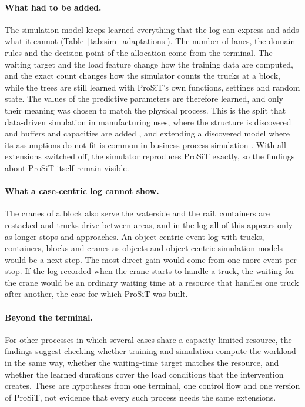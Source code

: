 \paragraph{What had to be added.} The simulation model keeps learned everything that
the log can express and adds what it cannot (Table~\ref{tab:sim_adaptations}). The
number of lanes, the domain rules and the decision point of the allocation come from
the terminal. The waiting target and the load feature change how the training data
are computed, and the exact count changes how the simulator counts the trucks at a
block, while the trees are still learned with ProSiT's own functions, settings and
random state. The values of the predictive parameters are
therefore learned, and only their meaning was chosen to match the physical process.
This is the split that data-driven simulation in manufacturing uses, where the
structure is discovered and buffers and capacities are added
\cite{LugaresiMatta2021,Grobis2025ProductionLogistics}, and extending a discovered
model where its assumptions do not fit is common in business process simulation
\cite{RWChapela2024Delays,runtimeIntegration2024}. With all extensions switched off,
the simulator reproduces ProSiT exactly, so the findings about ProSiT itself remain
visible.

\paragraph{What a case-centric log cannot show.} The cranes of a block also serve
the waterside and the rail, containers are restacked and trucks drive between areas,
and in the log all of this appears only as longer stops and approaches. An
object-centric event log with trucks, containers, blocks and cranes as objects
\cite{VanDerAalst2023OCPM} and object-centric simulation models
\cite{Knopp2023ObjectCentricSimulation} would be a next step. The most direct gain
would come from one more event per stop. If the log recorded when the crane starts to
handle a truck, the waiting for the crane would be an ordinary waiting time at a
resource that handles one truck after another, the case for which ProSiT was built.

\paragraph{Beyond the terminal.} For other processes in which several cases share a
capacity-limited resource, the findings suggest checking whether training and
simulation compute the workload in the same way, whether the waiting-time target
matches the resource, and whether the learned durations cover the load conditions
that the intervention creates. These are hypotheses from one terminal, one control
flow and one version of ProSiT, not evidence that every such process needs the same
extensions.

